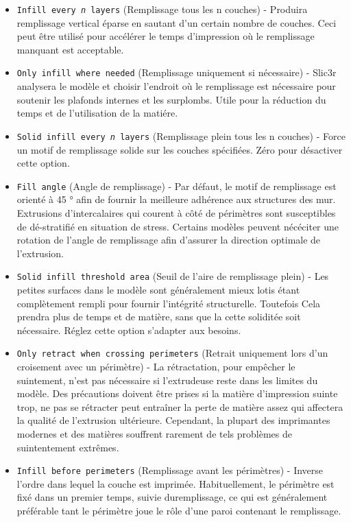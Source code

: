 \begin{itemize}
    \item \texttt{Infill every \textit{n} layers} (Remplissage tous les n couches) - Produira remplissage vertical \'eparse en sautant d'un certain nombre de couches. Ceci peut \^etre utilis\'e pour acc\'el\'erer le temps d'impression o\`u le remplissage manquant est acceptable.
    \item \texttt{Only infill where needed} (Remplissage uniquement si n\'ecessaire) - Slic3r analysera le mod\`ele et choisir l'endroit o\`u le remplissage est n\'ecessaire pour soutenir les plafonds internes et les surplombs. Utile pour la r\'eduction du temps et de l'utilisation de la mati\'ere.
    \item \texttt{Solid infill every \textit{n} layers} (Remplissage plein tous les n couches) - Force un motif de remplissage solide sur les couches sp\'ecifi\'ees. Z\'ero pour d\'esactiver cette option.
    \item \texttt{Fill angle} (Angle de remplissage) - Par d\'efaut, le motif de remplissage est orient\'e \`a 45 ° afin de fournir la meilleure adh\'erence aux structures des mur. Extrusions d'intercalaires qui courent \`a c\^ot\'e de p\'erim\`etres sont susceptibles de d\'e-stratifi\'e en situation de stress. Certains mod\`eles peuvent n\'ec\'eciter une rotation de l'angle de remplissage afin d'assurer la direction optimale de l'extrusion.
    \item \texttt{Solid infill threshold area} (Seuil de l'aire de remplissage plein) - Les petites surfaces dans le mod\`ele sont g\'en\'eralement mieux lotis \'etant compl\`etement rempli pour fournir l'int\'egrit\'e structurelle. Toutefois Cela prendra plus de temps et de mati\`ere, sans que la cette solidit\'ee soit n\'ecessaire. R\'eglez cette option s'adapter aux besoins.
    \item \texttt{Only retract when crossing perimeters} (Retrait uniquement lors d'un croisement avec un p\'erim\`etre) - La r\'etractation, pour emp\^echer le suintement, n'est pas n\'ecessaire si l'extrudeuse reste dans les limites du mod\`ele. Des pr\'ecautions doivent \^etre prises si la mati\`ere d'impression suinte trop, ne pas se r\'etracter peut entra\^iner la perte de mati\`ere assez qui affectera la qualit\'e de l'extrusion ult\'erieure. Cependant, la plupart des imprimantes modernes et des mati\`eres souffrent rarement de tels probl\`emes de suintentement extr\^emes.
    \item \texttt{Infill before perimeters} (Remplissage avant les p\'erim\`etres) - Inverse l'ordre dans lequel la couche est imprim\'ee. Habituellement, le p\'erim\`etre est fix\'e dans un premier temps, suivie duremplissage, ce qui est g\'en\'eralement pr\'ef\'erable tant le p\'erim\`etre joue le r\^ole d'une paroi contenant le remplissage.
\end{itemize}


